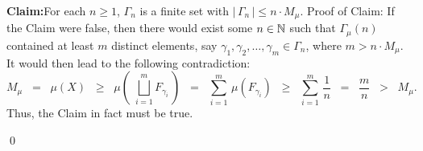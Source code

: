 	\begin{center}
	\begin{minipage}{6.5in}
	\vskip 0.1cm
	\noindent
	\textbf{Claim:}\;\;For each $n \geq 1$, $\Gamma_{n}$ is a finite set with $\left\vert\,\Gamma_{n}\,\right\vert \leq n\cdot M_{\mu}$.
	\vskip 0.2cm
	\noindent
	Proof of Claim:\quad
	If the Claim were false, then there would exist some $n \in \mathbb{N}$ such that $\Gamma_{\mu}(n)$
	contained at least $m$ distinct elements,
	say $\gamma_{1}, \gamma_{2}, \ldots, \gamma_{m} \in \Gamma_{n}$,
	where $m > n\cdot M_{\mu}$.
	It would then lead to the following contradiction:
	\begin{equation*}
	M_{\mu}\;\;=\;\;\mu(X)
	\;\;\geq\;\;\mu\!\left(\;\bigsqcup_{i=1}^{m} F_{\gamma_{i}}\,\right)
	\;\;=\;\; \sum_{i=1}^{m}\,\mu\!\left(F_{\gamma_{i}}\right)
	\;\;\geq\;\; \sum_{i=1}^{m}\,\dfrac{1}{n}
	\;\;=\;\;\dfrac{m}{n}
	\;\;>\;\; M_{\mu}.
	\end{equation*}
	Thus, the Claim in fact must be true.
	\end{minipage}
	\end{center}
\qed


